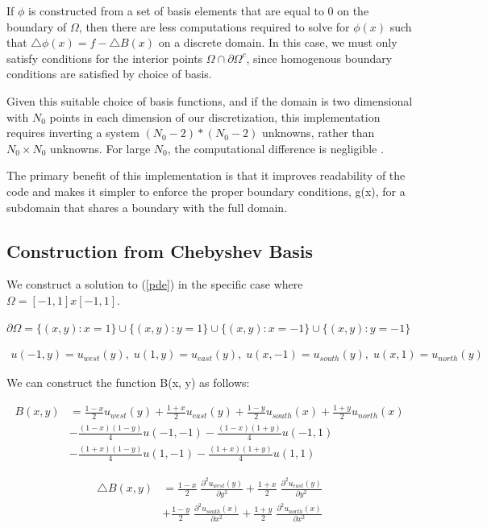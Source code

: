 \documentclass[final]{siamart1116}
\numberwithin{theorem}{section}
\begin{document}
If $\phi$ is constructed from a set of basis elements that are equal to 0 on the boundary of $\Omega$, then there are less computations required to solve for $\phi(x)$ such that $\bigtriangleup \phi(x) = f - \bigtriangleup B(x)$ on a discrete domain. In this case, we must only satisfy conditions for the interior points $\Omega \cap \partial \Omega^c$, since homogenous boundary conditions are satisfied by choice of basis.


Given this  suitable choice of basis functions, and if the domain is two dimensional with $N_0$ points in each dimension of our discretization, this implementation requires inverting a system $(N_0-2)*(N_0-2)$ unknowns, rather than $N_0 \times N_0 $ unknowns. For large $N_0$, the computational difference is negligible . 

The primary benefit of this implementation is that it improves readability of the code and makes it simpler to enforce the proper boundary conditions, g(x), for a subdomain that shares a boundary with the full domain.



\subsection{Construction from Chebyshev Basis} \label{sec:boydmethod}

We construct a solution to (\ref{pde}) in the specific case where $\Omega = [-1, 1] x [-1, 1]$. 

$\partial \Omega = \{(x, y): x = 1\} \cup  \{(x, y): y = 1\} \cup  \{(x, y): x = -1\} \cup \{(x, y): y = -1\}$


\begin{align*}
u(-1, y) = u_{west}(y), \; u(1, y) = u_{east}(y),  \; u(x, -1) = u_{south}(y),  \; u(x, 1) = u_{north}(y) 
\end{align*}

We can construct the function B(x, y) as follows:


\begin{align*}
B(x, y) &= \frac{1-x}{2} u_{west}(y) + \frac{1+x}{2} u_{east}(y) + \frac{1-y}{2} u_{south}(x) + \frac{1+y}{2} u_{north}(x) \\ 
		& - \frac{(1-x)(1-y)}{4}u(-1, -1) - \frac{(1-x)(1+y)}{4}u(-1, 1) \\
        & - \frac{(1+x)(1-y)}{4}u(1, -1) - \frac{(1+x)(1+y)}{4}u(1, 1) 
\end{align*}

\begin{align*}
\bigtriangleup B(x, y) &= \frac{1-x}{2} \; \frac{\partial^2 u_{west}(y) }{\partial y^2}+ \frac{1+x}{2} \; \frac{\partial^2 u_{east}(y) }{\partial y^2} \\
& + \frac{1-y}{2} \; \frac{\partial^2 u_{south}(x) }{\partial x^2} + \frac{1+y}{2} \; \frac{\partial^2 u_{north}(x) }{\partial x^2} \\ 
\end{align*}
\end{document}
